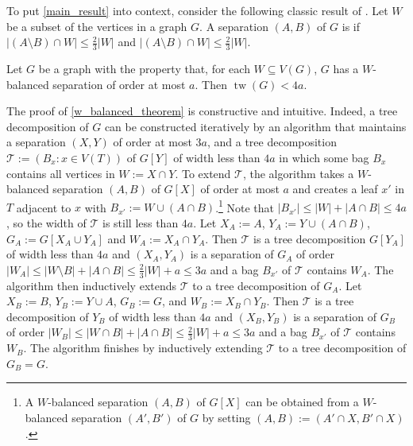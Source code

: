 \documentclass{patmorin}
\DeclareMathOperator{\tw}{tw}
\begin{document}
To put \cref{main_result} into context, consider the following classic result of \citet{robertson.seymour:graph}.
Let $W$ be a subset of the vertices in a graph $G$.  A separation $(A,B)$ of $G$ is  if $|(A\setminus B)\cap W|\le \tfrac{2}{3}|W|$ and $|(A\setminus B)\cap W|\le \tfrac{2}{3}|W|$.  

\begin{thm}\label{w_balanced_theorem}
    Let $G$ be a graph with the property that, for each $W\subseteq V(G)$, $G$ has a $W$-balanced separation of order at most $a$. Then  $\tw(G)<4a$.
\end{thm}

The proof of \cref{w_balanced_theorem} is constructive and intuitive.  Indeed, a tree decomposition of $G$ can be constructed iteratively by an algorithm that maintains a separation $(X,Y)$ of order at most $3a$, and a tree decomposition $\mathcal{T}:=(B_x:x\in V(T))$ of $G[Y]$ of width less than $4a$ in which some bag $B_x$ contains all vertices in $W:=X\cap Y$.  To extend $\mathcal{T}$, the algorithm takes a $W$-balanced separation $(A,B)$ of $G[X]$ of order at most $a$ and creates a leaf $x'$ in $T$ adjacent to $x$ with $B_{x'}:=W\cup (A\cap B)$.\footnote{A $W$-balanced separation $(A,B)$ of $G[X]$ can be obtained from a $W$-balanced separation $(A',B')$ of $G$ by setting $(A,B):=(A'\cap X,B'\cap X)$.}  Note that $|B_{x'}|\le |W|+|A\cap B|\le 4a$, so the width of $\mathcal{T}$ is still less than $4a$. 
Let $X_A:=A$, $Y_A:=Y\cup(A\cap B)$, $G_A:=G[X_A\cup Y_A]$ and $W_A:=X_A\cap Y_A$.  Then $\mathcal{T}$ is a tree decomposition $G[Y_A]$ of width less than $4a$ and $(X_A,Y_A)$ is a separation of $G_A$ of order $|W_A|\le|W\setminus B|+|A\cap B|\le \tfrac{2}{3}|W|+a\le 3a$ and a bag $B_{x'}$ of $\mathcal{T}$ contains $W_A$. The algorithm then inductively extends $\mathcal{T}$ to a tree decomposition of $G_A$.  Let $X_B:=B$, $Y_B:=Y\cup A$, $G_B:=G$, and $W_B:=X_B\cap Y_B$.  Then $\mathcal{T}$ is a tree decomposition of $Y_B$ of width less than $4a$ and $(X_B,Y_B)$ is a separation of $G_B$ of order $|W_B|\le |W\cap B|+|A\cap B|\le\tfrac{2}{3}|W|+a\le 3a$ and a bag $B_{x'}$ of $\mathcal{T}$ contains $W_B$.  The algorithm finishes by inductively extending $\mathcal{T}$ to a tree decomposition of $G_B=G$.

\end{document}
